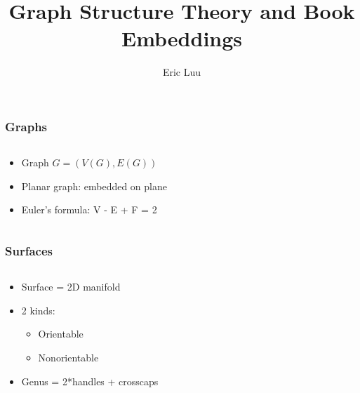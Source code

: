 \documentclass{beamer}
\author{Eric Luu}
\title{Graph Structure Theory and Book Embeddings}
\begin{document}
\frame{\titlepage}

\begin{frame}
    \frametitle{Graphs}

    \begin{columns}
      \begin{column}{0.5\textwidth}
        \begin{itemize}
          \item Graph $G = (V(G), E(G))$
          \item Planar graph: embedded on plane
          \item Euler's formula: V - E + F = 2
        \end{itemize}
      \end{column}

      \begin{column}{0.5 \textwidth}
        \begin{figure}
          \centering
          
        \end{figure}
      \end{column}
    \end{columns}
\end{frame}

\begin{frame}
    \frametitle{Surfaces}
    \begin{columns}
    \begin{column}{0.5\textwidth}
      \begin{itemize}
        \item Surface = 2D manifold
        \item 2 kinds: \begin{itemize}
          \item Orientable
          \item Nonorientable
        \end{itemize}
        \item Genus = 2*handles + crosscaps
      \end{itemize}
    \end{column}
    \begin{column}{0.5 \textwidth}
      \begin{figure}
        \centering
        
      \end{figure}
    \end{column}
    \end{columns}
\end{frame}
\end{document}
